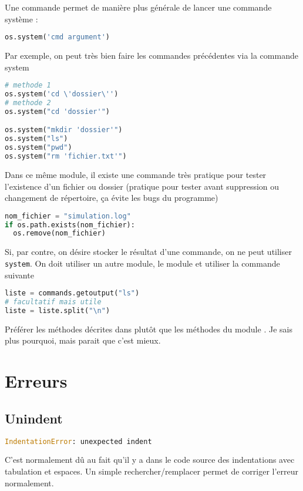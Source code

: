\documentclass[a4paper,twoside]{article}
\begin{document}
Une commande permet de manière plus générale de lancer une commande système :
\begin{lstlisting}[language=python]
os.system('cmd argument')
\end{lstlisting}

Par exemple, on peut très bien faire les commandes précédentes via la commande system
\begin{lstlisting}[language=python]
# methode 1
os.system('cd \'dossier\'')
# methode 2
os.system("cd 'dossier'")

os.system("mkdir 'dossier'")
os.system("ls")
os.system("pwd")
os.system("rm 'fichier.txt'")
\end{lstlisting}

Dans ce même module, il existe une commande très pratique pour tester l'existence d'un fichier ou dossier (pratique pour tester avant suppression ou changement de répertoire, ça évite les bugs du programme)
\begin{lstlisting}[language=python]
nom_fichier = "simulation.log"
if os.path.exists(nom_fichier):
  os.remove(nom_fichier)
\end{lstlisting}


Si, par contre, on désire stocker le résultat d'une commande, on ne peut utiliser \texttt{system}. On doit utiliser un autre module, le module  et utiliser la commande suivante
\begin{lstlisting}[language=python]
liste = commands.getoutput("ls")
# facultatif mais utile
liste = liste.split("\n")
\end{lstlisting}

\begin{attention}
Préférer les méthodes décrites dans  plutôt que les méthodes du module . Je sais plus pourquoi, mais parait que c'est mieux.
\end{attention}

\section{Erreurs}
\subsection{Unindent}
\begin{lstlisting}[language=python]
IndentationError: unexpected indent
\end{lstlisting}

C'est normalement dû au fait qu'il y a dans le code source des indentations avec tabulation et espaces. Un simple rechercher/remplacer permet de corriger l'erreur normalement.
\end{document}
